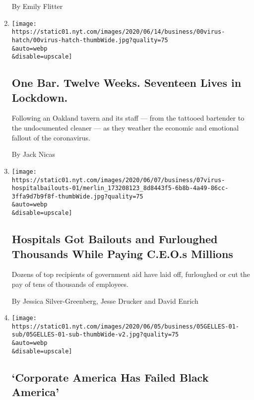 \begin{enumerate}
  By Emily Flitter
\item
  \href{/2020/06/11/business/coronavirus-california-lockdown-small-business.html}{}

  \texttt{[image: https://static01.nyt.com/images/2020/06/14/business/00virus-hatch/00virus-hatch-thumbWide.jpg?quality=75\\\&auto=webp\\\&disable=upscale]}

  \hypertarget{one-bar-twelve-weeks-seventeen-lives-in-lockdown}{%
  \subsection{One Bar. Twelve Weeks. Seventeen Lives in
  Lockdown.}\label{one-bar-twelve-weeks-seventeen-lives-in-lockdown}}

  Following an Oakland tavern and its staff --- from the tattooed
  bartender to the undocumented cleaner --- as they weather the economic
  and emotional fallout of the coronavirus.

  By Jack Nicas
\item
  \href{/2020/06/08/business/hospitals-bailouts-ceo-pay.html}{}

  \texttt{[image: https://static01.nyt.com/images/2020/06/07/business/07virus-hospitalbailouts-01/merlin\_173208123\_8d8443f5-6b8b-4a49-86cc-3ffa9d7b9f8f-thumbWide.jpg?quality=75\\\&auto=webp\\\&disable=upscale]}

  \hypertarget{hospitals-got-bailouts-and-furloughed-thousands-while-paying-ceos-millions}{%
  \subsection{Hospitals Got Bailouts and Furloughed Thousands While
  Paying C.E.O.s
  Millions}\label{hospitals-got-bailouts-and-furloughed-thousands-while-paying-ceos-millions}}

  Dozens of top recipients of government aid have laid off, furloughed
  or cut the pay of tens of thousands of employees.

  By Jessica Silver-Greenberg, Jesse Drucker and David Enrich
\item
  \href{/2020/06/06/business/corporate-america-has-failed-black-america.html}{}

  \texttt{[image: https://static01.nyt.com/images/2020/06/05/business/05GELLES-01-sub/05GELLES-01-sub-thumbWide-v2.jpg?quality=75\\\&auto=webp\\\&disable=upscale]}

  \hypertarget{corporate-america-has-failed-black-america}{%
  \subsection{`Corporate America Has Failed Black
  America'}\label{corporate-america-has-failed-black-america}}


\end{enumerate}
